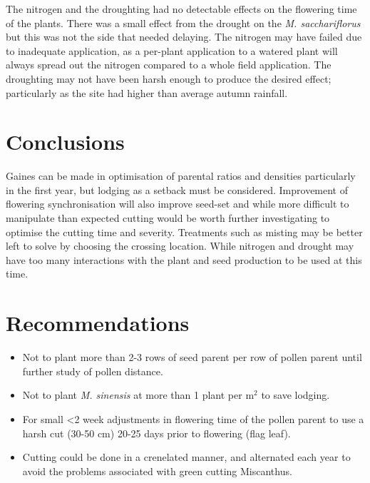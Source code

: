 \documentclass[fleqn, 15pt, lineno]{olplainarticle}
\begin{document}
The nitrogen and the droughting had no detectable effects on the flowering time of the plants.
There was a small effect from the drought on the \textit{M. sacchariflorus} but this was not the side that needed delaying.
The nitrogen may have failed due to inadequate application, as a per-plant application to a watered plant will always spread out the nitrogen compared to a whole field application.
The droughting may not have been harsh enough to produce the desired effect; particularly as the site had higher than average autumn rainfall.


\section{Conclusions}
Gaines can be made in optimisation of parental ratios and densities particularly in the first year, but lodging as a setback must be considered. Improvement of flowering synchronisation will also improve seed-set and while more difficult to manipulate than expected cutting would be worth further investigating to optimise the cutting time and severity. Treatments such as misting may be better left to solve by choosing the crossing location. While nitrogen and drought may have too many interactions with the plant and seed production to be used at this time.



\section*{Recommendations}
\begin{itemize}
    \item Not to plant more than 2-3 rows of seed parent per row of pollen parent until further study of pollen distance.
    \item Not to plant \textit{M. sinensis} at more than 1 plant per m$^2$ to save lodging.
    \item For small <2 week adjustments in flowering time of the pollen parent to use a harsh cut (30-50 cm) 20-25 days prior to flowering (flag leaf).
    \item Cutting could be done in a crenelated manner, and alternated each year to avoid the problems associated with green cutting Miscanthus.
\end{itemize}






\end{document}

